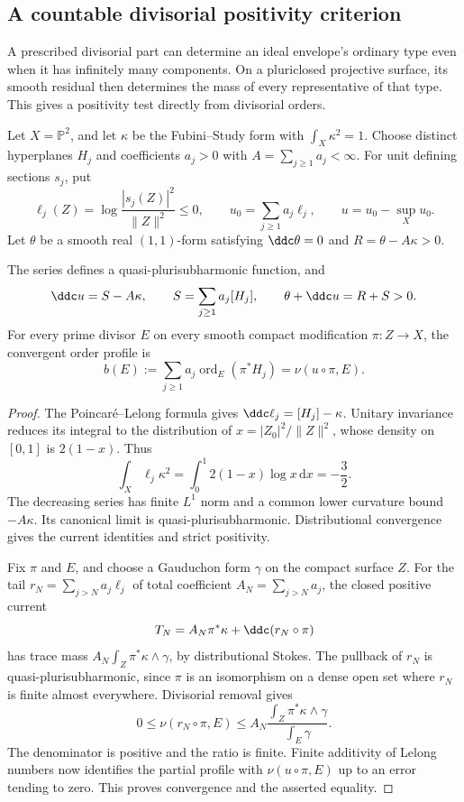 \subsection{A countable divisorial positivity criterion}
\label{subsec:countable-divisorial-positivity}

A prescribed divisorial part can determine an ideal envelope's
ordinary type even when it has infinitely many components.
On a pluriclosed projective surface, its smooth residual then
determines the mass of every representative of that type.
This gives a positivity test directly from divisorial orders.

Let $X=\mathbb P^2$, and let $\kappa$ be the Fubini--Study form
with $\int_X\kappa^2=1$. Choose distinct hyperplanes $H_j$ and
coefficients $a_j>0$ with $A=\sum_{j\geq1}a_j<\infty$.
For unit defining sections $s_j$, put
\[
 \ell_j(Z)=\log\frac{|s_j(Z)|^2}{\|Z\|^2}\leq0,
 \qquad u_0=\sum_{j\geq1}a_j\ell_j,
 \qquad u=u_0-\sup_Xu_0.
\]
Let $\theta$ be a smooth real $(1,1)$-form satisfying
$\ddc\theta=0$ and $R=\theta-A\kappa>0$.

\begin{lemma}\label{countable-divisorial:profile}
The series defines a quasi-plurisubharmonic function, and
\[
 \ddc u=S-A\kappa,\qquad
 S=\sum_{j\geq1}a_j[H_j],\qquad
 \theta+\ddc u=R+S>0.
\]
For every prime divisor $E$ on every smooth compact modification
$\pi:Z\to X$, the convergent order profile is
\[
 b(E):=\sum_{j\geq1}a_j\operatorname{ord}_E(\pi^*H_j)
       =\nu(u\circ\pi,E).
\]
\end{lemma}
\begin{proof}
The Poincar\'e--Lelong formula gives
$\ddc\ell_j=[H_j]-\kappa$. Unitary invariance reduces its
integral to the distribution of $x=|Z_0|^2/\|Z\|^2$, whose
density on $[0,1]$ is $2(1-x)$. Thus
\[
 \int_X\ell_j\kappa^2=\int_0^1 2(1-x)\log x\,\mathrm dx=-\frac32.
\]
The decreasing series has finite $L^1$ norm and a common
lower curvature bound $-A\kappa$. Its canonical limit is
quasi-plurisubharmonic. Distributional convergence gives the
current identities and strict positivity.

Fix $\pi$ and $E$, and choose a Gauduchon form $\gamma$ on the
compact surface $Z$. For the tail
$r_N=\sum_{j>N}a_j\ell_j$ of total coefficient
$A_N=\sum_{j>N}a_j$, the closed positive current
\[
 T_N=A_N\pi^*\kappa+\ddc(r_N\circ\pi)
\]
has trace mass $A_N\int_Z\pi^*\kappa\wedge\gamma$, by
distributional Stokes. The pullback of $r_N$ is
quasi-plurisubharmonic, since $\pi$ is an isomorphism on a
dense open set where $r_N$ is finite almost everywhere.
Divisorial removal gives
\[
 0\leq\nu(r_N\circ\pi,E)
 \leq A_N\frac{\int_Z\pi^*\kappa\wedge\gamma}{\int_E\gamma}.
\]
The denominator is positive and the ratio is finite.
Finite additivity of Lelong numbers now identifies the partial
profile with $\nu(u\circ\pi,E)$ up to an error tending to zero.
This proves convergence and the asserted equality.
\end{proof}

